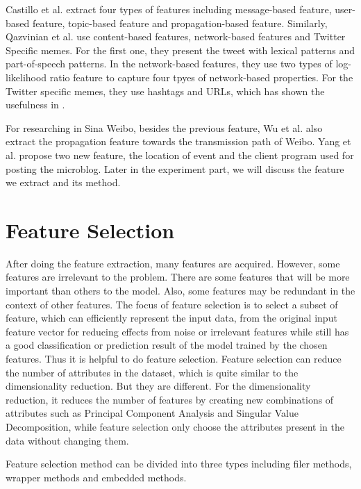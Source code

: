 Castillo et al. extract four types of features including message-based feature, user-based feature, topic-based feature and propagation-based feature\cite{castillo2011information}. Similarly, Qazvinian et al. use content-based features, network-based features and Twitter Specific memes\cite{qazvinian2011rumor}. For the first one, they present the tweet with lexical patterns and part-of-speech patterns\cite{hassan2010s}. In the network-based features, they use two types of log-likelihood ratio feature to capture four tpyes of network-based properties. For the Twitter specific memes, they use hashtags and URLs, which has shown the usefulness in \cite{ratkiewicz2010detecting}.

For researching in Sina Weibo, besides the previous feature,  Wu et al. also extract the propagation feature towards the transmission path of Weibo\cite{wu2015false}. Yang et al. propose two new feature, the location of event and the client program used for posting the microblog.\cite{yang2012automatic} Later in the experiment part, we will discuss the feature we extract and its method.

\section{Feature Selection}
After doing the feature extraction, many features are acquired. However, some features are irrelevant to the problem. There are some features that will be more important than others to the model. Also, some features may be redundant in the context of other features. The focus of feature selection is to select a subset of feature, which can efficiently represent the input data, from the original input feature vector for reducing effects from noise or irrelevant features while still has a good classification or prediction result of the model trained by the chosen features\cite{guyon2003introduction}. Thus it is helpful to do feature selection. Feature selection can reduce the number of attributes in the dataset, which is quite similar to the dimensionality reduction. But they are different. For the dimensionality reduction, it reduces the number of features by creating new combinations of attributes such as Principal Component Analysis\cite{jolliffe2002principal} and Singular Value Decomposition\cite{de1994singular}, while feature selection only choose the attributes present in the data without changing them.

Feature selection method can be divided into three types including filer methods, wrapper methods and embedded methods.
